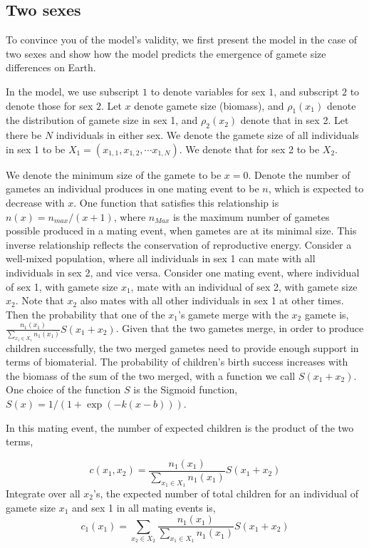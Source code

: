 \subsection{Two sexes}
To convince you of the model's validity, we first present the model in the case of two sexes and show how the model predicts the emergence of gamete size differences on Earth. 

In the model, we use subscript $1$ to denote variables for sex $1$, and subscript $2$ to denote those for sex $2$. Let $x$ denote gamete size (biomass), and $\rho_1(x_1)$ denote the distribution of gamete size in sex 1, and $\rho_2(x_2)$ denote that in sex 2. Let there be $N$ individuals in either sex. We denote the gamete size of all individuals in sex 1 to be $X_1 = (x_{1,1}, x_{1,2}, \cdots x_{1,N})$. We denote that for sex 2 to be $X_2$. 

We denote the minimum size of the gamete to be $x = 0$. Denote the number of gametes an individual produces in one mating event to be $n$, which is expected to decrease with $x$. One function that satisfies this relationship is $n(x) = n_{max}/(x + 1)$, where $n_{Max}$ is the maximum number of gametes possible produced in a mating event, when gametes are at its minimal size. This inverse relationship reflects the conservation of reproductive energy. 
Consider a well-mixed population, where all individuals in sex 1 can mate with all individuals in sex 2, and vice versa. Consider one mating event, where individual of sex 1, with gamete size $x_1$, mate with an individual of sex 2, with gamete size $x_2$. Note that $x_2$ also mates with all other individuals in sex 1 at other times. Then the probability that one of the $x_1$'s gamete merge with the $x_2$ gamete is, $ \frac{n_1(x_1)}{\sum_{x_1\in X_1} n_1(x_1)}S(x_1+ x_2)$. Given that the two gametes merge, in order to produce children successfully, the two merged gametes need to provide enough support in terms of biomaterial. The probability of children's birth success increases with the biomass of the sum of the two merged, with a function we call $S(x_1 + x_2)$. One choice of the function $S$ is the Sigmoid function, $S(x) = 1/(1 + \exp(-k (x - b)))$. 

In this mating event, the number of expected children is the product of the two terms,  

\begin{equation}\label{eq:c1}
    c(x_1, x_2) = \frac{n_1(x_1)}{\sum_{x_1\in X_1} n_1(x_1)}S(x_1+ x_2)
\end{equation}
Integrate over all $x_2$'s, the expected number of total children for an individual of gamete size $x_1$ and sex 1 in all mating events is, 
\begin{equation}
    c_1(x_1) = \sum_{x_2 \in X_2} \frac{n_1(x_1)}{\sum_{x_1\in X_1} n_1(x_1)} S(x_1+ x_2) 
\end{equation}

